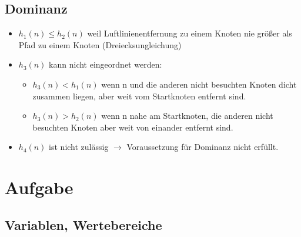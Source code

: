\documentclass[a4paper,draft=false,oneside,12pt,ngerman]{scrreprt}
\begin{document}
\section{Dominanz}
\label{sec:dominanz}

\begin{itemize}
    \item $ h_1(n) \leq h_2(n) $ weil Luftlinienentfernung zu einem Knoten nie größer als
        Pfad zu einem Knoten (Dreiecksungleichung)

    \item $ h_3(n) $ kann nicht eingeordnet werden:
        \begin{itemize}
            \item $ h_3(n) < h_1(n) $ wenn n und die anderen nicht besuchten Knoten dicht
                zusammen liegen, aber weit vom Startknoten entfernt sind.
            \item $ h_3(n) > h_2(n) $ wenn n nahe am Startknoten, die anderen
                nicht besuchten Knoten aber weit von einander entfernt sind.
        \end{itemize}

    \item $ h_4(n) $ ist nicht zulässig $\rightarrow$ Voraussetzung für Dominanz
        nicht erfüllt.
\end{itemize}

\chapter{Aufgabe}
\label{chp:aufgabe3}

\section{Variablen, Wertebereiche}
\label{sec:variablen_wertebereiche}
\end{document}
